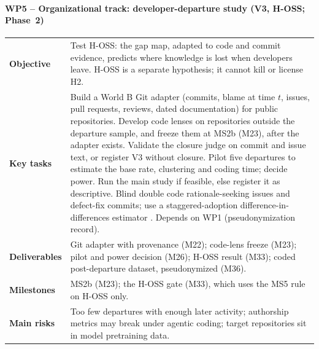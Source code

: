 \paragraph{WP5 -- Organizational track: developer-departure study (V3, H-OSS; Phase~2)}
\mbox{}\par
\begin{tabularx}{\linewidth}{@{}>{\bfseries}p{2.6cm}X@{}}
  \toprule
  Objective & Test H-OSS: the gap map, adapted to code and commit evidence, predicts where
    knowledge is lost when developers leave. H-OSS is a separate hypothesis; it cannot kill or
    license H2. \\
  Key tasks & Build a World B Git adapter (commits, blame at time $t$, issues, pull requests,
    reviews, dated documentation) for public repositories. Develop code lenses on repositories
    outside the departure sample, and freeze them at MS2b (M23), after the adapter exists. Validate the
    closure judge on commit and issue text, or register V3 without closure. Pilot five departures
    to estimate the base rate, clustering and coding time; decide power. Run the main study if
    feasible, else register it as descriptive. Blind double code rationale-seeking issues and
    defect-fix commits; use a staggered-adoption difference-in-differences estimator
    \evlit{} \parencite{callaway2021difference}. Depends on WP1 (pseudonymization record). \\
  Deliverables & Git adapter with provenance (M22); code-lens freeze (M23); pilot and power
    decision (M26); H-OSS result (M33); coded post-departure dataset, pseudonymized (M36). \\
  Milestones & MS2b (M23); the H-OSS gate (M33), which uses the MS5 rule on H-OSS only. \\
  Main risks & Too few departures with enough later activity; authorship metrics may break under
    agentic coding; target repositories sit in model pretraining data. \\
  \bottomrule
\end{tabularx}

